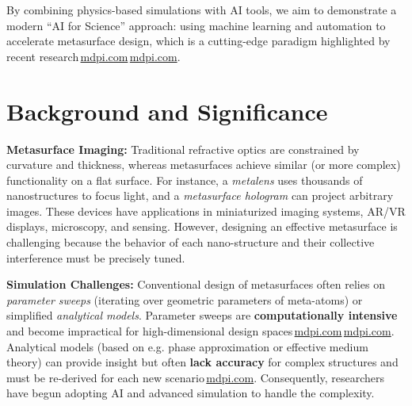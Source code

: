 \documentclass[11pt]{article}
\begin{document}
By combining physics-based simulations with AI tools, we aim to demonstrate a modern ``AI for Science'' approach: using machine learning and automation to accelerate metasurface design, which is a cutting-edge paradigm highlighted by recent research\,\href{https://www.mdpi.com/2304-6732/12/10/947#:~:text=Recently%2C%20the%20application%20of%20deep,429%2C353%20%2C%20431%2C355%20%2C%20433%2C357}{mdpi.com}\,\href{https://www.mdpi.com/2304-6732/12/10/947#:~:text=match%20at%20L1259%20RNNs%2C%20and,previously%20complex%20inverse%20design%20process}{mdpi.com}.

\section{Background and Significance}

\textbf{Metasurface Imaging:} Traditional refractive optics are constrained by curvature and thickness, whereas metasurfaces achieve similar (or more complex) functionality on a flat surface. For instance, a \emph{metalens} uses thousands of nanostructures to focus light, and a \emph{metasurface hologram} can project arbitrary images. These devices have applications in miniaturized imaging systems, AR/VR displays, microscopy, and sensing. However, designing an effective metasurface is challenging because the behavior of each nano-structure and their collective interference must be precisely tuned.

\textbf{Simulation Challenges:} Conventional design of metasurfaces often relies on \emph{parameter sweeps} (iterating over geometric parameters of meta-atoms) or simplified \emph{analytical models}. Parameter sweeps are \textbf{computationally intensive} and become impractical for high-dimensional design spaces\,\href{https://www.mdpi.com/2304-6732/12/10/947#:~:text=Traditional%20metasurface%20design%20methods%20mainly,simulate%20and%20analyze%20the%20electromagnetic}{mdpi.com}\,\href{https://www.mdpi.com/2304-6732/12/10/947#:~:text=performance%20metrics%20can%20be%20determined%2C,dimensional%20or%20complex%20scenarios}{mdpi.com}. Analytical models (based on e.g. phase approximation or effective medium theory) can provide insight but often \textbf{lack accuracy} for complex structures and must be re-derived for each new scenario\,\href{https://www.mdpi.com/2304-6732/12/10/947#:~:text=approach%20is%20computationally%20intensive%20and,Overall%2C%20traditional%20methods%20can%20partially}{mdpi.com}. Consequently, researchers have begun adopting AI and advanced simulation to handle the complexity.
\end{document}
